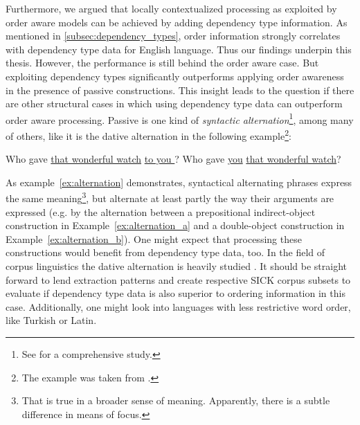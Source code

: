 Furthermore, we argued that locally contextualized processing as exploited by order aware models can be achieved by adding dependency type information. As mentioned in \ref{subsec:dependency_types}, order information strongly correlates with dependency type data for English language. Thus our findings underpin this thesis. However, the performance is still behind the order aware case. But exploiting dependency types significantly outperforms applying order awareness in the presence of passive constructions. This insight leads to the question if there are other structural cases in which using dependency type data can outperform order aware processing. Passive is one kind of \textit{syntactic alternation}\footnote{See \autocite{levin_english_1993} for a comprehensive study.}, among many of others, like it is the dative alternation in the following example\footnote{The example was taken from \autocite{kendall_dative_2011}.}:
\begin{exe}
	\ex \label{ex:alternation} 
	\begin{xlist}	
		\ex \label{ex:alternation_a} Who gave \underline{that wonderful watch} \underline{to you }?
		\ex \label{ex:alternation_b} Who gave \underline{you} \underline{that wonderful watch}?
	\end{xlist}
\end{exe}
As example~\ref{ex:alternation} demonstrates, syntactical alternating phrases express the same meaning\footnote{That is true in a broader sense of meaning. Apparently, there is a subtle difference in means of focus.}, but alternate at least partly the way their arguments are expressed (e.g. by the alternation between a prepositional indirect-object construction in Example~\ref{ex:alternation_a} and a double-object construction in Example~\ref{ex:alternation_b}). One might expect that processing these constructions would benefit from dependency type data, too. In the field of corpus linguistics the dative alternation is heavily studied \autocite{lapata_acquiring_1999,bresnan_gradience_2003,bresnan2007predicting,kendall_dative_2011}. It should be straight forward to lend extraction patterns and create respective SICK corpus subsets to evaluate if dependency type data is also superior to ordering information in this case. Additionally, one might look into languages with less restrictive word order, like Turkish or Latin.

